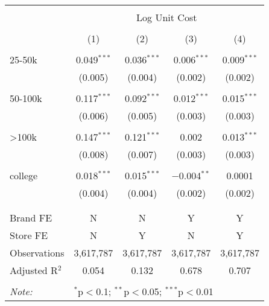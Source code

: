 
\begin{table}[!htbp] \centering 
  \caption{} 
  \label{} 
\begin{tabular}{@{\extracolsep{5pt}}lcccc} 
\\[-1.8ex]\hline 
\hline \\[-1.8ex] 
 & \multicolumn{4}{c}{Log Unit Cost} \\ 
\cline{2-5} 
\\[-1.8ex] & (1) & (2) & (3) & (4)\\ 
\hline \\[-1.8ex] 
 25-50k & 0.049$^{***}$ & 0.036$^{***}$ & 0.006$^{***}$ & 0.009$^{***}$ \\ 
  & (0.005) & (0.004) & (0.002) & (0.002) \\ 
  & & & & \\ 
 50-100k & 0.117$^{***}$ & 0.092$^{***}$ & 0.012$^{***}$ & 0.015$^{***}$ \\ 
  & (0.006) & (0.005) & (0.003) & (0.003) \\ 
  & & & & \\ 
 >100k & 0.147$^{***}$ & 0.121$^{***}$ & 0.002 & 0.013$^{***}$ \\ 
  & (0.008) & (0.007) & (0.003) & (0.003) \\ 
  & & & & \\ 
 college & 0.018$^{***}$ & 0.015$^{***}$ & $-$0.004$^{**}$ & 0.0001 \\ 
  & (0.004) & (0.004) & (0.002) & (0.002) \\ 
  & & & & \\ 
\hline \\[-1.8ex] 
Brand FE & N & N & Y & Y \\ 
Store FE & N & Y & N & Y \\ 
Observations & 3,617,787 & 3,617,787 & 3,617,787 & 3,617,787 \\ 
Adjusted R$^{2}$ & 0.054 & 0.132 & 0.678 & 0.707 \\ 
\hline 
\hline \\[-1.8ex] 
\textit{Note:}  & \multicolumn{4}{l}{$^{*}$p$<$0.1; $^{**}$p$<$0.05; $^{***}$p$<$0.01} \\ 
\end{tabular} 
\end{table} 
